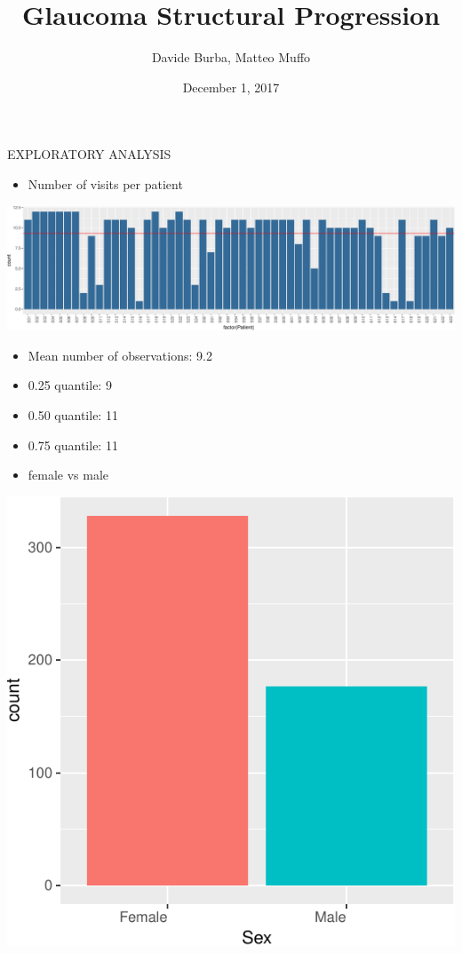 \documentclass[ignorenonframetext,]{beamer}
\title{Glaucoma Structural Progression}
\author{Davide Burba, Matteo Muffo}
\date{December 1, 2017}
\providecommand{\tightlist}{%
  \setlength{\itemsep}{0pt}\setlength{\parskip}{0pt}}
\begin{document}
\frame{\titlepage}

\begin{frame}{EXPLORATORY ANALYSIS}

\begin{itemize}
\tightlist
\item
  Number of visits per patient
\end{itemize}

\includegraphics{analisi_exp_markdown_files/figure-beamer/unnamed-chunk-2-1.pdf}

\begin{itemize}
\tightlist
\item
  Mean number of observations: 9.2
\item
  0.25 quantile: 9
\item
  0.50 quantile: 11
\item
  0.75 quantile: 11
\end{itemize}

\end{frame}

\begin{frame}{}

\begin{itemize}
\tightlist
\item
  female vs male
\end{itemize}

\includegraphics{analisi_exp_markdown_files/figure-beamer/unnamed-chunk-4-1.pdf}

\end{frame}
\end{document}

